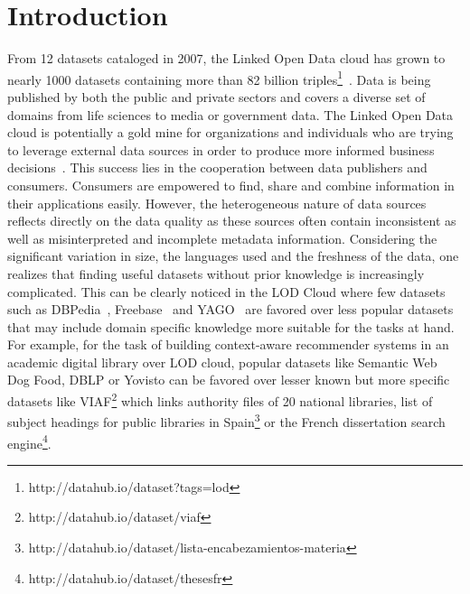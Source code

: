 \documentclass[runningheads,a4paper]{llncs}
\begin{document}
\section{Introduction}
\label{sec:introduction}
From 12 datasets cataloged in 2007, the Linked Open Data cloud has grown to nearly 1000 datasets containing more than 82 billion triples\footnote{http://datahub.io/dataset?tags=lod}~\cite{BizerHeath2009}. Data is being published by both the public and private sectors and covers a diverse set of domains from life sciences to media or government data. The Linked Open Data cloud is potentially a gold mine for organizations and individuals who are trying to leverage external data sources in order to produce more informed business decisions~\cite{Boyd2011}. This success lies in the cooperation between data publishers and consumers. Consumers are empowered to find, share and combine information in their applications easily. However, the heterogeneous nature of data sources reflects directly on the data quality as these sources often contain inconsistent as well as misinterpreted and incomplete metadata information. Considering the significant variation in size, the languages used and the freshness of the data, one realizes that finding useful datasets without prior knowledge is increasingly complicated. This can be clearly noticed in the LOD Cloud where few datasets such as DBPedia~\cite{Bizer:2009:DCP:1640541.1640848}, Freebase~\cite{Bollacker:2008:FCC:1376616.1376746} and YAGO~\cite{Suchanek:2007:YCS:1242572.1242667} are favored over less popular datasets that may include domain specific knowledge more suitable for the tasks at hand. For example, for the task of building context-aware recommender systems in an academic digital library over LOD cloud, popular datasets like Semantic Web Dog Food, DBLP or Yovisto can be favored over lesser known but more specific datasets like VIAF\footnote{http://datahub.io/dataset/viaf} which links authority files of 20 national libraries, list of subject headings for public libraries in Spain\footnote{http://datahub.io/dataset/lista-encabezamientos-materia} or the French dissertation search engine\footnote{http://datahub.io/dataset/thesesfr}.
\end{document}
